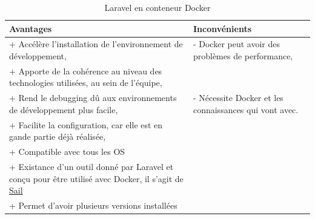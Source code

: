 \documentclass[
    iai, %
    il, %
]{heig-tb}
\begin{document}
\begin{table}[h]
    \begin{center}
        \caption{Laravel en conteneur Docker \label{dev-laravel-docker}}
        \begin{tabularx}{1.0\textwidth} {X|X}
            Avantages                                                                                                                   & Inconvénients
            \\ \hline
            + Accélère l'installation de l'environnement de développement, \cite{labrecque}                                             & - Docker peut avoir des problèmes de performance, \cite{labrecque}      \\
            + Apporte de la cohérence au niveau des technologies utilisées, au sein de l'équipe, \cite{labrecque, data-flair-use-cases} &                                                                         \\
            + Rend le debugging dû aux environnements de développement plus facile, \cite{labrecque,koukia}                             & - Nécessite Docker et les connaissances qui vont avec. \cite{labrecque} \\
            + Facilite la configuration, car elle est en gande partie déjà réalisée, \cite{data-flair-pros-cons}                        &                                                                         \\
            + Compatible avec tous les OS                                                                                               &                                                                         \\
            + Existance d'un outil donné par Laravel et conçu pour être utilisé avec Docker, il
            s'agit de \href{https://laravel.com/docs/9.x/sail}{Sail}
                                                                                                                                        &                                                                         \\
            + Permet d'avoir plusieurs versions installées                                                                              &                                                                         \\
        \end{tabularx}
    \end{center}
\end{table}
\end{document}
